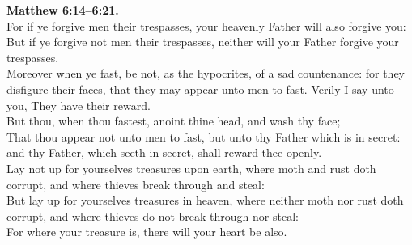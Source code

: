 \documentclass[12pt]{article} %
\begin{document}
{\begin{minipage}[t]{0.45\textwidth}
\textbf{Matthew 6:14--6:21.}\\
For if ye forgive men their trespasses, your heavenly Father will also forgive you:\\
But if ye forgive not men their trespasses, neither will your Father forgive your trespasses.\\
Moreover when ye fast, be not, as the hypocrites, of a sad countenance: for they disfigure their faces, that they may appear unto men to fast. Verily I say unto you, They have their reward.\\
But thou, when thou fastest, anoint thine head, and wash thy face;\\
That thou appear not unto men to fast, but unto thy Father which is in secret: and thy Father, which seeth in secret, shall reward thee openly.\\
Lay not up for yourselves treasures upon earth, where moth and rust doth corrupt, and where thieves break through and steal:\\
But lay up for yourselves treasures in heaven, where neither moth nor rust doth corrupt, and where thieves do not break through nor steal:\\
For where your treasure is, there will your heart be also.\\

\end{minipage}}
\vspace*{\fill}
\newpage
\huge%
\vspace*{\fill}
\begin{spacing}{1.2}
\end{spacing}
\vspace*{\fill}
\end{document}
